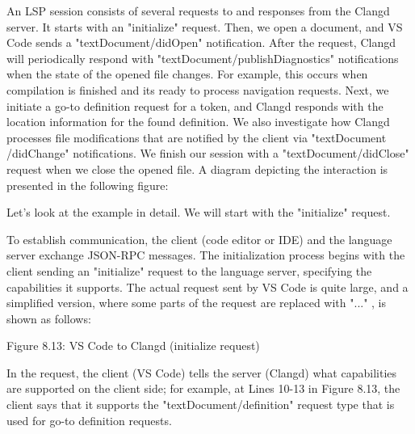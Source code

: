 An LSP session consists of several requests to and responses from the Clangd server. It starts with an "initialize" request. Then, we open a document, and VS Code sends a "textDocument/didOpen" notification. After the request, Clangd will periodically respond with "textDocument/publishDiagnostics" notifications when the state of the opened file changes. For example, this occurs when compilation is finished and its ready to process navigation requests. Next, we initiate a go-to definition request for a token, and Clangd responds with the location information for the found definition. We also investigate how Clangd processes file modifications that are notified by the client via "textDocument /didChange" notifications. We finish our session with a "textDocument/didClose" request when we close the opened file. A diagram depicting the interaction is presented in the following figure:


Let's look at the example in detail. We will start with the "initialize" request.


To establish communication, the client (code editor or IDE) and the language server exchange JSON-RPC messages. The initialization process begins with the client sending an "initialize" request to the language server, specifying the capabilities it supports. The actual request sent by VS Code is quite large, and a simplified version, where some parts of the request are replaced with "..." , is shown as follows:

\begin{shell}
{
 "id": 0,
 "jsonrpc": "2.0",
 "method": "initialize",
 "params": {
   "capabilities": {
     ...
     "textDocument": {
       ...
       "definition": {
         "dynamicRegistration": true,
         "linkSupport": true
       },
       ...
     },
     "clientInfo": {
       "name": "Visual Studio Code",
       "version": "1.85.1"
     },
     ...
   }
 }
\end{shell}


\begin{center}
Figure 8.13: VS Code to Clangd (initialize request)
\end{center}

In the request, the client (VS Code) tells the server (Clangd) what capabilities are supported on the client side; for example, at Lines 10-13 in Figure 8.13, the client says that it supports the "textDocument/definition" request type that is used for go-to definition requests.

